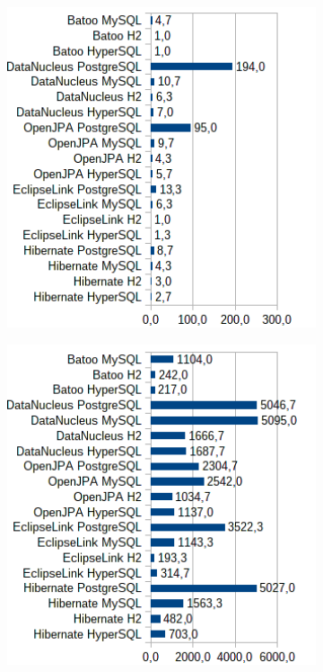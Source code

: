 \begin{figure}
\begin{subfigure}[b]{1\textwidth}
\includegraphics[width=25em]{obr/bench/jpa11}
\end{subfigure}
\begin{subfigure}[b]{1\textwidth}
\includegraphics[width=25em]{obr/bench/jpa12}
\end{subfigure}
\end{figure}

